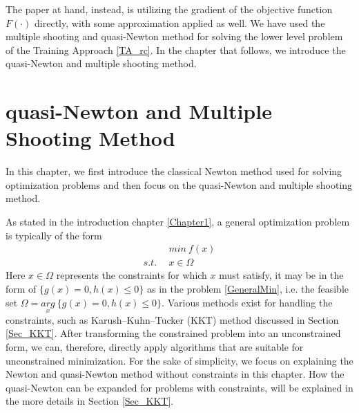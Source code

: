 	The paper at hand, instead, is utilizing the gradient of the objective function $F(\cdot)$ directly, with some approximation applied as well. We have used the multiple shooting and quasi-Newton method for solving the lower level problem of the Training Approach \ref{TA_rc}. In the chapter that follows, we introduce the quasi-Newton and multiple shooting method. 
	
	
	\chapter{quasi-Newton and Multiple Shooting Method}
	In this chapter, we first introduce the classical Newton method used for solving optimization problems and then focus on the quasi-Newton and multiple shooting method. 
	
	As stated in the introduction chapter \ref{Chapter1}, a general optimization problem is typically of the form 
	\begin{equation}
		\begin{aligned}
			\  \  \ & min \  f(x) \\
			s.t.\ \  & x \in \Omega
		\end{aligned}
		\label{OptGen}
	\end{equation}
	Here $x \in \Omega$ represents the constraints for which $x$ must satisfy, it may be in the form of $\{g(x) = 0,  h(x)  \leq  0 \}$ as in the problem \ref{GeneralMin}, i.e. the feasible set $\Omega = \underset{x}{arg} \ \{ g(x) = 0,  h(x)  \leq  0 \}$. Various methods exist for handling the constraints, such as  Karush–Kuhn–Tucker (KKT) method discussed in Section \ref{Sec_KKT}. After transforming the constrained problem into an unconstrained form, we can, therefore, directly apply algorithms that are suitable for unconstrained minimization. For the sake of simplicity, we focus on explaining the Newton and quasi-Newton method without constraints in this chapter. How the quasi-Newton can be expanded for problems with constraints, will be explained in the more details in Section \ref{Sec_KKT}. 
	

